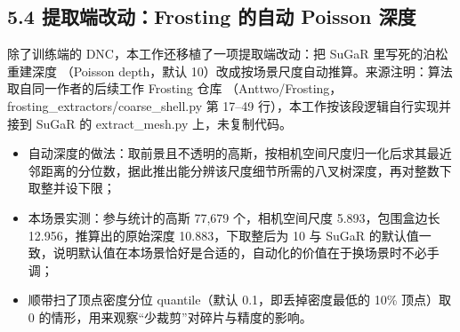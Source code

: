 \documentclass[UTF8,a4paper,11pt]{ctexart}
\begin{document}
\subsection{5.4 提取端改动：Frosting 的自动 Poisson 深度}
除了训练端的 DNC，本工作还移植了一项提取端改动：把 SuGaR 里写死的泊松重建深度 （Poisson depth，默认 10）改成按场景尺度自动推算。来源注明：算法取自同一作者的后续工作 Frosting 仓库 （Anttwo/Frosting，frosting\_extractors/coarse\_shell.py 第 17--49 行），本工作按该段逻辑自行实现并接到 SuGaR 的 extract\_mesh.py 上，未复制代码。

\begin{itemize}
\setlength{\itemsep}{2pt}
  \item 自动深度的做法：取前景且不透明的高斯，按相机空间尺度归一化后求其最近邻距离的分位数，据此推出能分辨该尺度细节所需的八叉树深度，再对整数下取整并设下限；
  \item 本场景实测：参与统计的高斯 77,679 个，相机空间尺度 5.893，包围盒边长 12.956，推算出的原始深度 10.883，下取整后为 10 \textemdash{}\textemdash{} 与 SuGaR 的默认值一致，说明默认值在本场景恰好是合适的，自动化的价值在于换场景时不必手调；
  \item 顺带扫了顶点密度分位 quantile（默认 0.1，即丢掉密度最低的 10\% 顶点）取 0 的情形，用来观察“少裁剪”对碎片与精度的影响。
\end{itemize}
\end{document}
